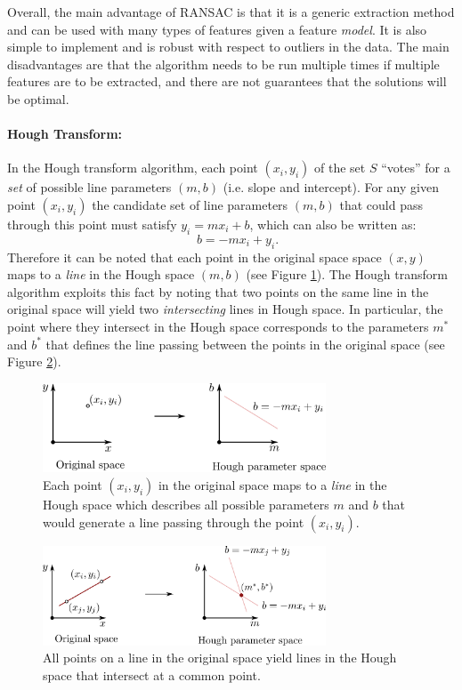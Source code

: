 Overall, the main advantage of RANSAC is that it is a generic extraction method and can be used with many types of features given a feature \textit{model}. It is also simple to implement and is robust with respect to outliers in the data. The main disadvantages are that the algorithm needs to be run multiple times if multiple features are to be extracted, and there are not guarantees that the solutions will be optimal.

\paragraph{Hough Transform:}
In the Hough transform algorithm, each point $(x_i,y_i)$ of the set $S$ ``votes'' for a \textit{set} of possible line parameters $(m,b)$ (i.e. slope and intercept). For any given point $(x_i,y_i)$ the candidate set of line parameters $(m,b)$ that could pass through this point must satisfy $y_i=mx_i+b$, which can also be written as:
\begin{equation*}
\quad b=-mx_i + y_i.
\end{equation*}
Therefore it can be noted that each point in the original space space $(x,y)$ maps to a \textit{line} in the Hough space $(m,b)$ (see Figure \ref{fig:hough1}). The Hough transform algorithm exploits this fact by noting that two points on the same line in the original space will yield two \textit{intersecting} lines in Hough space. In particular, the point where they intersect in the Hough space corresponds to the parameters $m^*$ and $b^*$ that defines the line passing between the points in the original space (see Figure \ref{fig:hough2}).
\begin{figure}[ht]
  \centering
  \includegraphics[width=0.75\textwidth]{tex/figs/ch12_fig/hough.png}
\caption{Each point $(x_i, y_i)$ in the original space maps to a \textit{line} in the Hough space which describes all possible parameters $m$ and $b$ that would generate a line passing through the point $(x_i, y_i)$.}
\label{fig:hough1}
\end{figure}
\begin{figure}[ht]
  \centering
  \includegraphics[width=0.75\textwidth]{tex/figs/ch12_fig/hough2.png}
\caption{All points on a line in the original space yield lines in the Hough space that intersect at a common point.}
\label{fig:hough2}
\end{figure}

